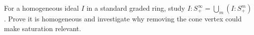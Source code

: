 \begin{problem}\label{chal:vi34-01}
For a homogeneous ideal \(I\) in a standard graded ring, study \(I:S_+^\infty=\bigcup_m(I:S_+^m)\). Prove it is homogeneous and investigate why removing the cone vertex could make saturation relevant.
\end{problem}
